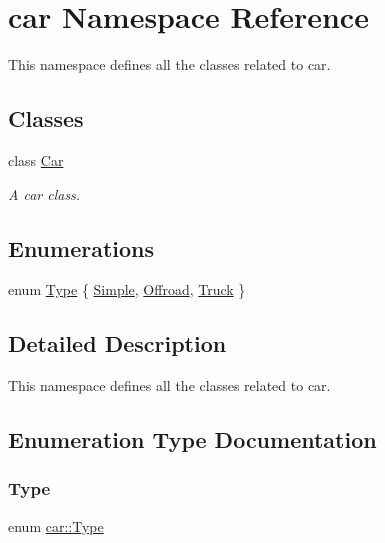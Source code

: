 \hypertarget{namespacecar}{}\section{car Namespace Reference}
\label{namespacecar}


This namespace defines all the classes related to car.  


\subsection*{Classes}
\begin{DoxyCompactItemize}
\item 
class \hyperlink{classcar_1_1_car}{Car}
\begin{DoxyCompactList}\small\item\em A car class. \end{DoxyCompactList}\end{DoxyCompactItemize}
\subsection*{Enumerations}
\begin{DoxyCompactItemize}
\item 
enum \hyperlink{namespacecar_a5a73671161a4e115408b2d713d3280a6}{Type} \{ \hyperlink{namespacecar_a5a73671161a4e115408b2d713d3280a6a5ce481a43a85b11ac7967b87e24fe98a}{Simple}, 
\hyperlink{namespacecar_a5a73671161a4e115408b2d713d3280a6a76f3757d1ab783f3cebc06f2796fe0ed}{Offroad}, 
\hyperlink{namespacecar_a5a73671161a4e115408b2d713d3280a6ab832d72752d4b3c31d270ef1e36574f8}{Truck}
 \}
\end{DoxyCompactItemize}


\subsection{Detailed Description}
This namespace defines all the classes related to car. 

\subsection{Enumeration Type Documentation}
\hypertarget{namespacecar_a5a73671161a4e115408b2d713d3280a6}{}\label{namespacecar_a5a73671161a4e115408b2d713d3280a6} 
\subsubsection{\texorpdfstring{Type}{Type}}
{\footnotesize\ttfamily enum \hyperlink{namespacecar_a5a73671161a4e115408b2d713d3280a6}{car\+::\+Type}}

